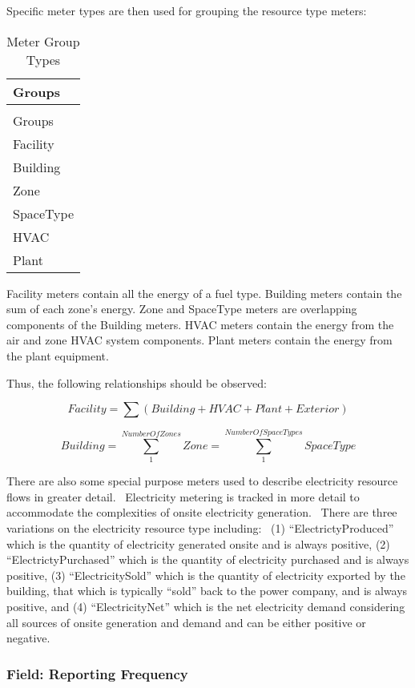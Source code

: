 Specific meter types are then used for grouping the resource type meters:

\begin{longtable}[c]{@{}l@{}}
\caption{Meter Group Types \label{table:overall-meter-types}} \tabularnewline
\toprule
Groups \tabularnewline
\midrule
\endfirsthead

\caption[]{Meter Group Types} \tabularnewline
\toprule
Groups \tabularnewline
\midrule
\endhead

Facility \tabularnewline
Building \tabularnewline
Zone \tabularnewline
SpaceType \tabularnewline
HVAC \tabularnewline
Plant \tabularnewline
\bottomrule
\end{longtable}

Facility meters contain all the energy of a fuel type. Building meters contain the sum of each zone's energy. Zone and SpaceType meters are overlapping components of the Building meters. HVAC meters contain the energy from the air and zone HVAC system components. Plant meters contain the energy from the plant equipment.

Thus, the following relationships should be observed:

\begin{equation}
Facility = \sum {\left( {Building + HVAC + Plant + Exterior} \right)}
\end{equation}

\begin{equation}
Building = \sum\limits_1^{NumberOfZones} {Zone} = \sum\limits_1^{NumberOfSpaceTypes} {SpaceType}
\end{equation}

There are also some special purpose meters used to describe electricity resource flows in greater detail.~ Electricity metering is tracked in more detail to accommodate the complexities of onsite electricity generation.~ There are three variations on the electricity resource type including:~ (1) ``ElectrictyProduced'' which is the quantity of electricity generated onsite and is always positive, (2) ``ElectrictyPurchased'' which is the quantity of electricity purchased and is always positive, (3) ``ElectricitySold'' which is the quantity of electricity exported by the building, that which is typically ``sold'' back to the power company, and is always positive, and (4) ``ElectricityNet'' which is the net electricity demand considering all sources of onsite generation and demand and can be either positive or negative.

\subsubsection{Field: Reporting Frequency}\label{field-reporting-frequency-1}

